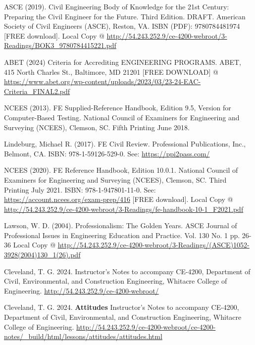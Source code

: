 \documentclass[12pt]{article}
\begin{document}
\begin{thebibliography}{}

ASCE (2019). Civil Engineering Body of Knowledge for the 21st Century: Preparing the Civil
Engineer for the Future. Third Edition. DRAFT. American Society of Civil Engineers (ASCE),
Reston, VA. ISBN (PDF): 9780784481974 [FREE download]. Local Copy @ \url{http://54.243.252.9/ce-4200-webroot/3-Readings/BOK3_9780784415221.pdf}

ABET (2024) Criteria for Accrediting ENGINEERING PROGRAMS. 
ABET, 415 North Charles St., Baltimore, MD 21201 
[FREE DOWNLOAD] @ \url{https://www.abet.org/wp-content/uploads/2023/03/23-24-EAC-Criteria_FINAL2.pdf}

NCEES (2013). FE Supplied-Reference Handbook, Edition 9.5, Version for Computer-Based
Testing. National Council of Examiners for Engineering and Surveying (NCEES), Clemson,
SC. Fifth Printing June 2018.

Lindeburg, Michael R. (2017). FE Civil Review. Professional Publications, Inc., Belmont,
CA. ISBN: 978-1-59126-529-0. See: \url{https://ppi2pass.com/}

NCEES (2020). FE Reference Handbook, Edition 10.0.1. National Council of Examiners for
Engineering and Surveying (NCEES), Clemson, SC. Third Printing July 2021. ISBN: 978-1-947801-11-0.
See: \url{https://account.ncees.org/exam‐prep/416} [FREE download]. Local Copy @ \url{http://54.243.252.9/ce-4200-webroot/3-Readings/fe-handbook-10-1_F2021.pdf}

Lawson, W. D. (2004). Professionalism: The Golden Years. 
ASCE Journal of Professional Issues in Engineering Education and Practice. Vol. 130 No. 1 pp. 26-36
Local Copy @ \url{http://54.243.252.9/ce-4200-webroot/3-Readings/(ASCE)1052-3928(2004)130_1(26).pdf}

Cleveland, T. G. 2024. Instructor's Notes to accompany CE-4200, Department of Civil, Environmental, and Construction Engineering, Whitacre College of Engineering. \url{http://54.243.252.9/ce-4200-webroot/}

Cleveland, T. G. 2024. \textbf{Attitudes} Instructor's Notes to accompany CE-4200, Department of Civil, Environmental, and Construction Engineering, Whitacre College of Engineering. \url{http://54.243.252.9/ce-4200-webroot/ce-4200-notes/_build/html/lessons/attitudes/attitudes.html}


\end{thebibliography}
\end{document}
